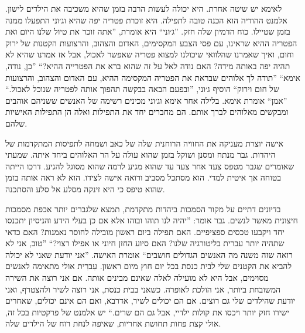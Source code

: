 \documentclass[14pt, article, extrafontsizes, twopage, a4paper]{memoir}
\begin{document}
לאימא יש שיטה אחרת. היא יכולה לעשות הרבה בזמן שהיא משכיבה את הילדים לישון. אלמנט ההודיה הוא
הכנה טובה לתפילה. היא זוכרת פטריה יפה
שהיא וג׳וני התפעלו ממנה בזמן שטיילו.
כוח הדמיון שלה חזק. ''ג׳וני`` היא
אומרת, ''אתה זוכר את טיול שלנו היום ואת הפטריה ההיא
שראינו, עם פסי הצבע המקסימים, האדום והצהוב,
והרצועות הקטנות של ירוק וחום, ואיך שאמרנו
שהלוואי שיכולנו למצוא פטריה שאפשר לאכול, אבל אז אמרנו
שהיא לא תהיה יפה באותה מידה? האם נודה לאל
על זה שהוא ברא את הפטרייה ההיא?“ ''כן, נודה, אימא`` ''תודה לך
אלוהים שבראת את הפטריה המקסימה ההיא, עם האדום והצהוב,
והרצועות של חום וירוק`` הוסיף ג׳וני, ''ובפעם
הבאה בבקשה תהפוך אותה לפטריה שנוכל לאכול.`` ''אמן``
אומרת אימא. בלילה אחר אימא וג׳וני
מכינים רשימה של האנשים ששניהם אוהבים ומבקשים מאלוהים
לברך אותם. הם מחברים יחד את התפילות ואלה הן
התפילות האישיות שלהם.

אישה יוצרת מעניקה את החוויה הרוחנית שלה של
כאב ושמחה לתפיסות המתקדמות של היהדות.
גבר מנתח ומסנן ושוקל בזמן שהוא
עולה על הר האלוהים ביחד איתה. שמעתי שאומרים שגבר
מטפס צעד אחר צעד עד שהוא מגיע לרמה שהוא מסוגל
להגיע. דרכו הייתה בטוחה אך איטית למדי. הוא מסתכל
מסביב ורואה אישה לצידו. הוא לא ראה אותה
בזמן שהוא טיפס כי היא זינקה מסלע אל סלע והסתכנה.

בדיונים דתיים על מקור הסמכות
ביהדות מתקדמת, תמצא שלגברים יותר אכפת
מסמכות חיצונית מאשר לנשים. גבר אומר: ”יהיה לנו
תוהו ובוהו אלא אם כן בעלי הידע והניסיון יתכנסו
יחד ויקבעו טכסים ספציפיים. האם תפילה ביום ראשון
מובילה לחוסר נאמנות? האם כדאי שתהיה יותר עברית
בליטורגיה שלנו? האם סיוע החזן חיוני או
אפילו רצוי?“ ”טוב, אני לא רואה שזה משנה מה
האנשים הגדולים חושבים“ אומרת האישה. ”אני יודעת שאני לא יכולה להביא
את הקטנים שלי לבית כנסת בכל יום חוץ מיום ראשון. עִברִית
אולי מתאימה לאנשים מסוימים, אבל היא לא מועילה
לאלה שאינם מבינים אותה. אם אני רוצה את השירה המשובחת ביותר,
אני הולכת לאופרה. כשאני בבית כנסת, אני רוצה
לשיר ולהצטרף, ואני יודעת שהילדים שלי גם רוצים. אם הם
יכולים לשיר, אדרבא, ואם הם אינם יכולים, שאחרים
ישירו חזק יותר ויכסו את קולות ילדיי, אבל גם הם
שרים.“ יש אלמנט של פרקטיות בכל
זה, אולי קצת פחות תחושת אחריות, שאיפה
לנחת רוח של הילדים שלה.
\end{document}
